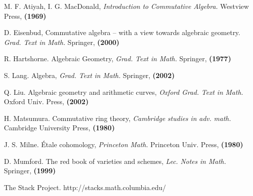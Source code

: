 \newpage

\begin{thebibliography}{10}

M. F. Atiyah, I. G. MacDonald, 
{\em Introduction to Commutative Algebra.}
Westview Press, \textbf{(1969)}

D. Eisenbud,
Commutative algebra -- with a view towards algebraic geometry.
{\em Grad. Text in Math.}
Springer, \textbf{(2000)}

R. Hartshorne.
Algebraic Geometry, {\em Grad. Text in Math.}
Springer, \textbf{(1977)}

S. Lang.
Algebra, {\em Grad. Text in Math.}
Springer, \textbf{(2002)}

Q. Liu.
Algebraic geometry and arithmetic curves, {\em Oxford Grad. Text in Math.}
Oxford Univ. Press, \textbf{(2002)}

H. Matsumura.
Commutative ring theory, {\em Cambridge studies in adv. math.}
Cambridge University Press, \textbf{(1980)}

J. S. Milne.
\'Etale cohomology, {\em Princeton Math.}
Princeton Univ. Press, \textbf{(1980)}

D. Mumford.
The red book of varieties and schemes, {\em Lec. Notes in Math.}
Springer, \textbf{(1999)}

The Stack Project.
http://stacks.math.columbia.edu/

\end{thebibliography}
